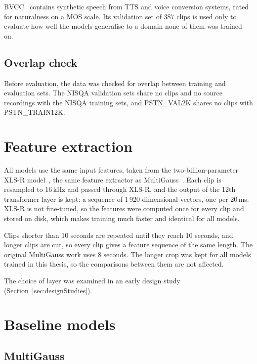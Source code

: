 \documentclass[
english,                 %
bibtex,                  %
includeExtraAbstracts, %
]{kththesis}
\numberwithin{listing}{chapter}
\begin{document}
BVCC~\cite{cooper_ssw_2021} contains synthetic speech from \gls{TTS} and voice conversion systems, rated for naturalness on a MOS scale. Its validation set of 387 clips is used only to evaluate how well the models generalise to a domain none of them was trained on.

\subsection{Overlap check}

Before evaluation, the data was checked for overlap between training and evaluation sets. The NISQA validation sets share no clips and no source recordings with the NISQA training sets, and PSTN\_VAL2K shares no clips with PSTN\_TRAIN12K.

\section{Feature extraction}
\label{sec:features}

All models use the same input features, taken from the two-billion-parameter XLS-R model~\cite{babu_xlsr_2022}, the same feature extractor as MultiGauss~\cite{cumlin_multigauss_2025}. Each clip is resampled to 16\,kHz and passed through XLS-R, and the output of the 12th transformer layer is kept: a sequence of 1\,920-dimensional vectors, one per 20\,ms. XLS-R is not fine-tuned, so the features were computed once for every clip and stored on disk, which makes training much faster and identical for all models.

Clips shorter than 10 seconds are repeated until they reach 10 seconds, and longer clips are cut, so every clip gives a feature sequence of the same length. The original MultiGauss work uses 8 seconds. The longer crop was kept for all models trained in this thesis, so the comparisons between them are not affected.

The choice of layer was examined in an early design study (Section~\ref{sec:designStudies}).

\section{Baseline models}
\label{sec:baselines}

\subsection{MultiGauss}
\end{document}
